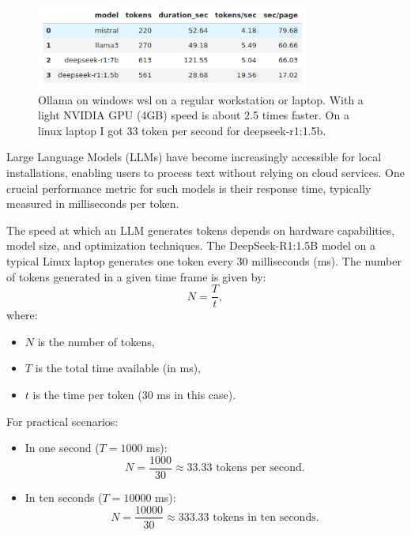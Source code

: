 \begin{figure}[h]
    \centering
    \includegraphics[width=0.8\textwidth]{images/token_per_second.png}
    \caption{Ollama on windows wsl on a regular workstation or laptop. With a light NVIDIA GPU (4GB) speed is about 2.5 times faster. On a linux laptop I got 33 token per second for deepseek-r1:1.5b.}
    \label{fig:ollama_chatbot}
\end{figure}

Large Language Models (LLMs) have become increasingly accessible for local installations, enabling users to process text without relying on cloud services. One crucial performance metric for such models is their response time, typically measured in milliseconds per token.

The speed at which an LLM generates tokens depends on hardware capabilities, model size, and optimization techniques. The DeepSeek-R1:1.5B model on a typical Linux laptop generates one token every 30 milliseconds (ms). The number of tokens generated in a given time frame is given by:
\begin{equation}
    N = \frac{T}{t},
\end{equation}
where:
\begin{itemize}
    \item $N$ is the number of tokens,
    \item $T$ is the total time available (in ms),
    \item $t$ is the time per token (30 ms in this case).
\end{itemize}

For practical scenarios:
\begin{itemize}
    \item In one second ($T = 1000$ ms):
    \begin{equation}
        N = \frac{1000}{30} \approx 33.33 \text{ tokens per second}.
    \end{equation}
    \item In ten seconds ($T = 10000$ ms):
    \begin{equation}
        N = \frac{10000}{30} \approx 333.33 \text{ tokens in ten seconds}.
    \end{equation}
\end{itemize}

